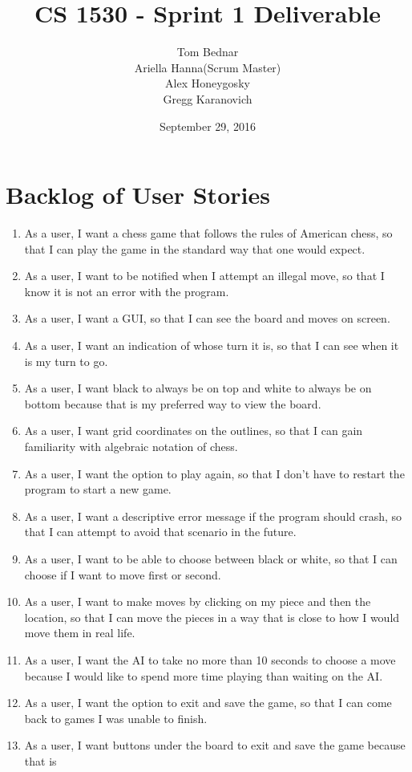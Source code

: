 \documentclass{article}
\author{
	\begin{tabular}{c c}
	&Tom Bednar \\ & Ariella Hanna(Scrum Master) \\ & Alex Honeygosky \\ &Gregg Karanovich
	\end{tabular}
}
\date{September 29, 2016}
\title{CS 1530 - Sprint 1 Deliverable}
\begin{document}
	\maketitle
	\newpage
	
	\section{Backlog of User Stories}
	\begin{enumerate}
		\item As a user, I want a chess game that follows the rules of American chess, so that I can
	play the game in the standard way that one would expect.
		\item As a user, I want to be notified when I attempt an illegal move, so that I know it is
	not an error with the program.
		\item As a user, I want a GUI, so that I can see the board and moves on screen.
		\item As a user, I want an indication of whose turn it is, so that I can see when it is my
	turn to go.
		\item As a user, I want black to always be on top and white to always be on bottom because
	that is my preferred way to view the board.
		\item As a user, I want grid coordinates on the outlines, so that I can gain familiarity with
	algebraic notation of chess.
		\item As a user, I want the option to play again, so that I don't have to restart the program
	to start a new game.
		\item As a user, I want a descriptive error message if the program should crash, so that
	I can attempt to avoid that scenario in the future.
		\item As a user, I want to be able to choose between black or white, so that I can choose
	if I want to move first or second.
		\item As a user, I want to make moves by clicking on my piece and then the location, so that
	I can move the pieces in a way that is close to how I would move them in real life.
		\item As a user, I want the AI to take no more than 10 seconds to choose a move because I
	would like to spend more time playing than waiting on the AI.
		\item As a user, I want the option to exit and save the game, so that I can come back to games
	I was unable to finish.
		\item As a user, I want buttons under the board to exit and save the game because that is

\end{enumerate}
\end{document}
